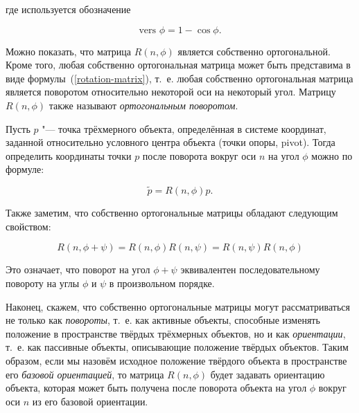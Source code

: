 \noindent где используется обозначение

$$\textrm{vers }\phi=1-\cos \phi.$$

Можно показать, что матрица $R(n,\phi)$ является собственно ортогональной. Кроме того, любая собственно ортогональная
матрица может быть представима в виде формулы~(\ref{rotation-matrix}), т.~е. любая собственно ортогональная матрица
является поворотом относительно некоторой оси на некоторый угол. Матрицу $R(n,\phi)$ также называют
\textit{ортогональным поворотом}.

Пусть $p$ "--- точка трёхмерного объекта, определённая в системе координат, заданной относительно условного центра
объекта (точки опоры, pivot). Тогда определить координаты точки $p$ после поворота вокруг оси $n$ на угол $\phi$
можно по формуле:

$$
\tilde p=R(n,\phi)p.
$$

Также заметим, что собственно ортогональные матрицы обладают следующим свойством:

$$
R(n,\phi+\psi)=R(n,\phi)R(n,\psi)=R(n,\psi)R(n,\phi)
$$

Это означает, что поворот на угол $\phi+\psi$ эквивалентен последовательному повороту на углы $\phi$ и $\psi$ в
произвольном порядке.

Наконец, скажем, что собственно ортогональные матрицы могут рассматриваться не только как \textit{повороты}, т.~е. как
активные объекты, способные изменять положение в пространстве твёрдых трёхмерных объектов, но и как
\textit{ориентации}, т.~е. как пассивные объекты, описывающие положение твёрдых объектов. Таким образом, если мы назовём
исходное положение твёрдого объекта в пространстве его \textit{базовой ориентацией}, то матрица $R(n,\phi)$ будет
задавать ориентацию объекта, которая может быть получена после поворота объекта на угол $\phi$ вокруг оси $n$ из его
базовой ориентации.
